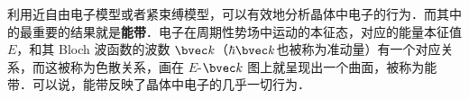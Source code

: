 
利用近自由电子模型或者紧束缚模型，可以有效地分析晶体中电子的行为．而其中的最重要的结果就是\textbf{能带}．电子在周期性势场中运动的本征态，对应的能量本征值 $E$，和其 Bloch 波函数的波数 $\bvec k$（$\hbar \bvec k$也被称为准动量）有一个对应关系，而这被称为色散关系，画在 $E$-${\bvec k}$ 图上就呈现出一个曲面，被称为能带．可以说，能带反映了晶体中电子的几乎一切行为．